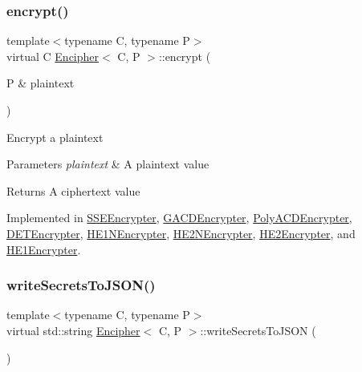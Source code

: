 \subsubsection{\texorpdfstring{encrypt()}{encrypt()}}
{\footnotesize\ttfamily template$<$typename C, typename P$>$ \\
virtual C \hyperlink{classEncipher}{Encipher}$<$ C, P $>$\+::encrypt (\begin{DoxyParamCaption}\item[{P \&}]{plaintext }\end{DoxyParamCaption})\hspace{0.3cm}{\ttfamily [pure virtual]}}

Encrypt a plaintext 
\begin{DoxyParams}{Parameters}
{\em plaintext} & A plaintext value \\
\hline
\end{DoxyParams}
\begin{DoxyReturn}{Returns}
A ciphertext value 
\end{DoxyReturn}


Implemented in \hyperlink{classSSEEncrypter_ab13571d2a7a8875226bf8901cd080949}{S\+S\+E\+Encrypter}, \hyperlink{classGACDEncrypter_a310a857f6b77a6c83d4319968d49902f}{G\+A\+C\+D\+Encrypter}, \hyperlink{classPolyACDEncrypter_a5233a73398d39d93567392c64a120e1e}{Poly\+A\+C\+D\+Encrypter}, \hyperlink{classDETEncrypter_a9d628bff7fe333ece3c39f3827727582}{D\+E\+T\+Encrypter}, \hyperlink{classHE1NEncrypter_a9a9c76558466ac56093cb6da937c7fe3}{H\+E1\+N\+Encrypter}, \hyperlink{classHE2NEncrypter_aa7ae559f2407b7a5527bd42470224e1b}{H\+E2\+N\+Encrypter}, \hyperlink{classHE2Encrypter_a57e4bdacbab9b11467f26deab921d134}{H\+E2\+Encrypter}, and \hyperlink{classHE1Encrypter_afc178d8e27a1263bef824bfc8960dbc0}{H\+E1\+Encrypter}.

\mbox{\label{classEncipher_a27d3efa1e364c1f0d7def65454c61b85}} 
\subsubsection{\texorpdfstring{write\+Secrets\+To\+J\+S\+O\+N()}{writeSecretsToJSON()}}
{\footnotesize\ttfamily template$<$typename C, typename P$>$ \\
virtual std\+::string \hyperlink{classEncipher}{Encipher}$<$ C, P $>$\+::write\+Secrets\+To\+J\+S\+ON (\begin{DoxyParamCaption}{ }\end{DoxyParamCaption})\hspace{0.3cm}{\ttfamily [pure virtual]}}

